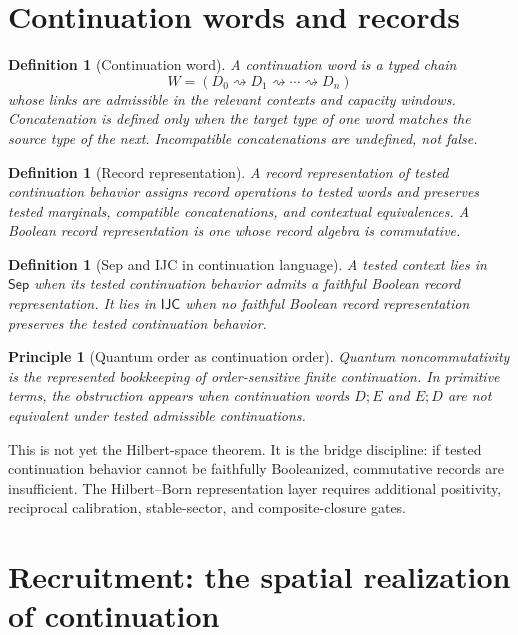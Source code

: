 \documentclass[11pt]{article}
\newtheorem{definition}[theorem]{Definition}
\newtheorem{principle}[theorem]{Principle}
\theoremstyle{remark}
\newcommand{\goes}{\rightsquigarrow}
\newcommand{\Sep}{\mathsf{Sep}}
\newcommand{\IJC}{\mathsf{IJC}}
\begin{document}
\section{Continuation words and records}

\begin{definition}[Continuation word]
A continuation word is a typed chain
\[
        W=(D_0\goes D_1\goes\cdots\goes D_n)
\]
whose links are admissible in the relevant contexts and capacity windows.  Concatenation is defined only when the target type of one word matches the source type of the next.  Incompatible concatenations are undefined, not false.
\end{definition}

\begin{definition}[Record representation]
A record representation of tested continuation behavior assigns record operations to tested words and preserves tested marginals, compatible concatenations, and contextual equivalences.  A Boolean record representation is one whose record algebra is commutative.
\end{definition}

\begin{definition}[Sep and IJC in continuation language]
A tested context lies in \(\Sep\) when its tested continuation behavior admits a faithful Boolean record representation.  It lies in \(\IJC\) when no faithful Boolean record representation preserves the tested continuation behavior.
\end{definition}

\begin{principle}[Quantum order as continuation order]
Quantum noncommutativity is the represented bookkeeping of order-sensitive finite continuation.  In primitive terms, the obstruction appears when continuation words \(D;E\) and \(E;D\) are not equivalent under tested admissible continuations.
\end{principle}

This is not yet the Hilbert-space theorem.  It is the bridge discipline: if tested continuation behavior cannot be faithfully Booleanized, commutative records are insufficient.  The Hilbert--Born representation layer requires additional positivity, reciprocal calibration, stable-sector, and composite-closure gates.

\section{Recruitment: the spatial realization of continuation}
\end{document}
